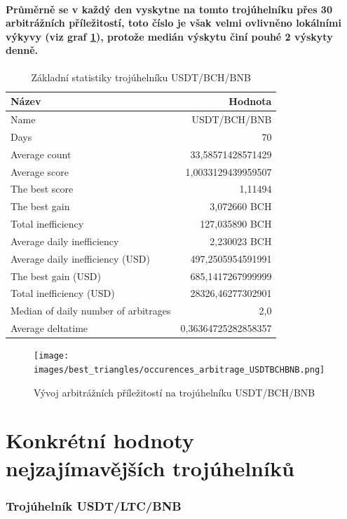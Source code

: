 \documentclass[thesis=B,czech]{FITthesis}[2019/03/21]
\begin{document}
\paragraph{
Průměrně se v každý den vyskytne na tomto trojúhelníku přes 30 arbitrážních příležitostí, toto číslo je však velmi ovlivněno lokálními výkyvy (viz graf \ref{occurences_arbitrage_USDTBCHBNB}), protože medián výskytu činí pouhé 2 výskyty denně.
}
\begin{table}\centering
\caption{Základní statistiky trojúhelníku USDT/BCH/BNB}
\label{USDTBCHBNB_stats}
\begin{tabular}{|| l | r ||}
\hline Název & Hodnota \\ 
\hline\hline Name & USDT/BCH/BNB \\ 
\hline Days & 70 \\ 
\hline Average count & 33,58571428571429 \\ 
\hline Average score & 1,0033129439959507 \\ 
\hline The best score & 1,11494 \\ 
\hline The best gain & 3,072660 BCH \\ 
\hline Total inefficiency & 127,035890 BCH \\ 
\hline Average daily inefficiency & 2,230023 BCH \\ 
\hline Average daily inefficiency (USD) & 497,2505954591991 \\ 
\hline The best gain (USD) & 685,1417267999999 \\ 
\hline Total inefficiency (USD) & 28326,46277302901 \\ 
\hline Median of daily number of arbitrages & 2,0 \\ 
\hline Average deltatime & 0,36364725282858357 \\ 
\hline
\end{tabular}
\end{table}

\begin{figure}\centering
	\texttt{[image: images/best\_triangles/occurences\_arbitrage\_USDTBCHBNB.png]}
	\caption{Vývoj arbitrážních příležitostí na trojúhelníku USDT/BCH/BNB }\label{occurences_arbitrage_USDTBCHBNB}
\end{figure}
\section{Konkrétní hodnoty nejzajímavějších trojúhelníků}

\subsubsection{Trojúhelník USDT/LTC/BNB}
\end{document}
